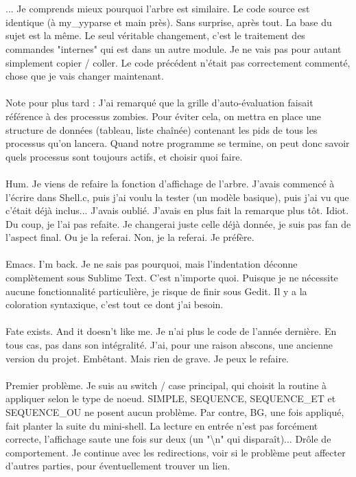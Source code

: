 \\\\
... Je comprends mieux pourquoi l'arbre est similaire. Le code source est identique (à my\_yyparse et main près). Sans surprise, après tout. La base du sujet est la même. Le seul véritable changement, c'est le traitement des commandes "internes" qui est dans un autre module. Je ne vais pas pour autant simplement copier / coller. Le code précédent n'était pas correctement commenté, chose que je vais changer maintenant.
\\\\
Note pour plus tard : J'ai remarqué que la grille d'auto-évaluation faisait référence à des processus zombies. Pour éviter cela, on mettra en place une structure de données (tableau, liste chaînée) contenant les pids de tous les processus qu'on lancera. Quand notre programme se termine, on peut donc savoir quels processus sont toujours actifs, et choisir  quoi faire.
\\\\
Hum. Je viens de refaire la fonction d'affichage de l'arbre. J'avais commencé à l'écrire dans Shell.c, puis j'ai voulu la tester (un modèle basique), puis j'ai vu que c'était déjà inclus... J'avais oublié. J'avais en plus fait la remarque plus tôt. Idiot. Du coup, je l'ai pas refaite. Je changerai juste celle déjà donnée, je suis pas fan de l'aspect final. Ou je la referai. Non, je la referai. Je préfère.
\\\\
Emacs. I'm back. Je ne sais pas pourquoi, mais l'indentation déconne complètement sous Sublime Text. C'est n'importe quoi. Puisque je ne nécessite aucune fonctionnalité particulière, je risque de finir sous Gedit. Il y a la coloration syntaxique, c'est tout ce dont j'ai besoin.
\\\\
Fate exists. And it doesn't like me. Je n'ai plus le code de l'année dernière. En tous cas, pas dans son intégralité. J'ai, pour une raison abscons, une ancienne version du projet. Embêtant. Mais rien de grave. Je peux le refaire.
\\\\
Premier problème. Je suis au switch / case principal, qui choisit la routine à appliquer selon le type de noeud. SIMPLE, SEQUENCE, SEQUENCE\_ET et SEQUENCE\_OU ne posent aucun problème. Par contre, BG, une fois appliqué, fait planter la suite du mini-shell. La lecture en entrée n'est pas forcément correcte, l'affichage saute une fois sur deux (un "\textbackslash{n}" qui disparaît)... Drôle de comportement. Je continue avec les redirections, voir si le problème peut affecter d'autres parties, pour éventuellement trouver un lien.
